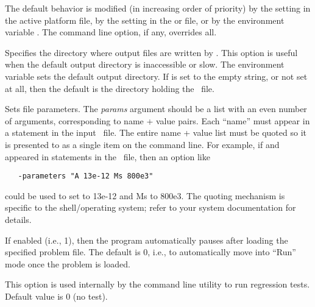\begin{description}
  The default behavior is modified (in increasing order of priority) by the
   setting in the active  platform
  file, by the  setting in the 
  or  file, or by the environment variable
  .  The
   command line option, if any, overrides all.
\item[\optkey{-outdir dir}]
  Specifies the directory where output files are written by
  .  This option is useful when the default output
  directory is inaccessible or slow. The environment variable
   sets the
  default output directory.  If  is set to the empty
  string, or not set at all, then the default is the directory holding
  the \MIF\ file.
\item[\optkey{-parameters params}]
  Sets  file
  parameters.  The \textit{params} argument should be a list with an
  even number of arguments, corresponding to name + value pairs.  Each
  ``name'' must appear in a
  statement in the input
  \MIF\ file.  The entire name + value list must be quoted so it is
  presented to  as a single item on the command line.  For
  example, if  and  appeared in  statements
  in the \MIF\ file, then an option like
\begin{verbatim}
   -parameters "A 13e-12 Ms 800e3"
\end{verbatim}
  could be used to set  to 13e-12 and Ms to 800e3.  The quoting
  mechanism is specific to the shell/operating system; refer to your system
  documentation for details.
\item[\optkey{-pause \boa 0\pipe 1\bca}]
  If enabled (i.e., 1), then the program automatically pauses after
  loading the specified problem file.  The default is 0, i.e., to
  automatically move into ``Run'' mode once the problem is loaded.
\item[\optkey{-regression\_test flag}]
  This option is used internally by the
  command line utility to run regression tests.  Default value is 0 (no
  test).
\item[\optkey{-regression\_testname basename}]

\end{description}

